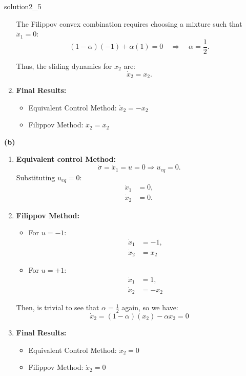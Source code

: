 \begin{solution}{}{solution2_5}
\begin{enumerate}
		      The Filippov convex combination requires choosing a mixture such that $\dot{x}_1 = 0$:
		      \[
			      (1-\alpha)(-1) + \alpha(1) = 0 \quad \Rightarrow \quad \alpha = \frac{1}{2}.
		      \]

		      Thus, the sliding dynamics for $x_2$ are:
		      \[
			      \dot{x}_2 = x_2.
		      \]

		\item \textbf{Final Results:}
		      \begin{itemize}
			      \item Equivalent Control Method: $\dot{x}_2 = -x_2$
			      \item Filippov Method: $\dot{x}_2 = x_2$
		      \end{itemize}
	\end{enumerate}
	\textbf{(b)}
	\begin{enumerate}
		\item \textbf{Equivalent control Method:}
		      \[
			      \dot{\sigma} = \dot{x}_1 = u = 0 \Rightarrow u_{eq} = 0.
		      \]
		      Substituting $u_{eq} = 0$:
		      \begin{align*}
			      \dot{x}_1 & = 0, \\
			      \dot{x}_2 & = 0.
		      \end{align*}
		\item \textbf{Filippov Method:}
		      \begin{itemize}
			      \item For $u = -1$:
			            \begin{align*}
				            \dot{x}_1 & = -1, \\
				            \dot{x}_2 & = x_2
			            \end{align*}
			      \item For $u = +1$:
			            \begin{align*}
				            \dot{x}_1 & = 1,   \\
				            \dot{x}_2 & = -x_2
			            \end{align*}
		      \end{itemize}
		      Then, is trivial to see that $\alpha = \frac{1}{2}$ again, so we have:
		      \[
			      \dot{x}_2 = (1-\alpha)(x_2) - \alpha x_2 = 0
		      \]
		\item \textbf{Final Results:}
		      \begin{itemize}
			      \item Equivalent Control Method: $\dot{x}_2 = 0$
			      \item Filippov Method: $\dot{x}_2 = 0$

\end{itemize}
\end{enumerate}
\end{solution}

